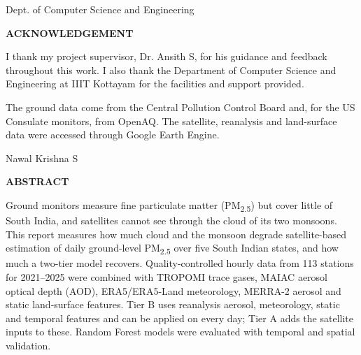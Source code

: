 \documentclass[12pt,a4wide]{report}
\newcommand{\pmtf}{PM\textsubscript{2.5}}                 %
\theoremstyle{plain}
\theoremstyle{definition}
\theoremstyle{remark}
\begin{document}
\noindent \hfill Dept. of Computer Science and Engineering

\clearpage


\begin{center}
{\large{\bf{ACKNOWLEDGEMENT}}}
\end{center}

I thank my project supervisor, Dr. Ansith S, for his guidance and feedback throughout this work. I
also thank the Department of Computer Science and Engineering at IIIT Kottayam for the facilities
and support provided.

The ground data come from the Central Pollution Control Board and, for the US Consulate monitors,
from OpenAQ. The satellite, reanalysis and land-surface data were accessed through Google Earth
Engine.


\vspace{1cm}
\noindent \hfill Nawal Krishna S

\clearpage






\begin{center}
{\Large{\bf{ABSTRACT}}}
\end{center}


Ground monitors measure fine particulate matter (\pmtf{}) but cover little of South India, and
satellites cannot see through the cloud of its two monsoons. This report measures how much cloud and the monsoon degrade satellite-based estimation of
daily ground-level \pmtf{} over five South Indian states, and how much a two-tier model recovers. Quality-controlled hourly data from 113 stations for 2021--2025 were
combined with TROPOMI trace gases, MAIAC aerosol optical depth (AOD), ERA5/ERA5-Land meteorology,
MERRA-2 aerosol and static land-surface features. Tier B uses reanalysis aerosol, meteorology, static
and temporal features and can be applied on every day; Tier A adds the satellite inputs to these.
Random Forest models were evaluated with temporal and spatial validation.
\end{document}
